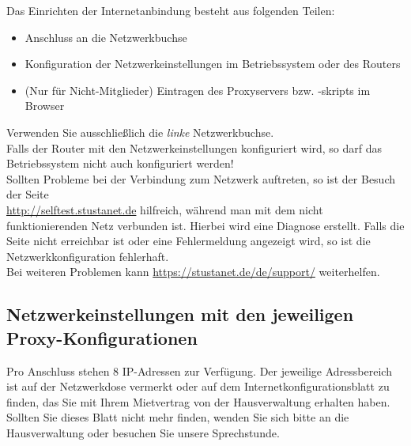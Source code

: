 \documentclass[a4paper,12pt]{scrartcl}
\begin{document}
Das Einrichten der Internetanbindung besteht aus folgenden Teilen:
\begin{itemize}
	\item Anschluss an die Netzwerkbuchse
	\item Konfiguration der Netzwerkeinstellungen im Betriebssystem oder des Routers
	\item (Nur für Nicht-Mitglieder) Eintragen des Proxyservers bzw. -skripts im Browser
\end{itemize}
Verwenden Sie ausschließlich die \emph{linke} Netzwerkbuchse.\\
Falls der Router mit den Netzwerkeinstellungen konfiguriert wird, so darf das Betriebssystem nicht auch konfiguriert werden!\\
Sollten Probleme bei der Verbindung zum Netzwerk auftreten, so ist der Besuch der Seite\\
\mbox{\url{http://selftest.stustanet.de}} hilfreich, während man mit dem nicht funktionierenden Netz verbunden ist. Hierbei wird eine Diagnose erstellt. Falls die Seite nicht erreichbar ist oder eine Fehlermeldung angezeigt wird, so ist die Netzwerkkonfiguration fehlerhaft.\\
Bei weiteren Problemen kann \mbox{\url{https://stustanet.de/de/support/}} weiterhelfen.

\pagebreak 

\subsection*{Netzwerkeinstellungen mit den jeweiligen Proxy-Konfigurationen}

Pro Anschluss stehen 8 IP-Adressen zur Verfügung. Der jeweilige Adressbereich ist auf der Netzwerkdose vermerkt oder auf dem Internetkonfigurationsblatt zu finden, das Sie mit Ihrem Mietvertrag von der Hausverwaltung erhalten haben. Sollten Sie dieses Blatt nicht mehr finden, wenden Sie sich bitte an die Hausverwaltung oder besuchen Sie unsere Sprechstunde. %
\end{document}
